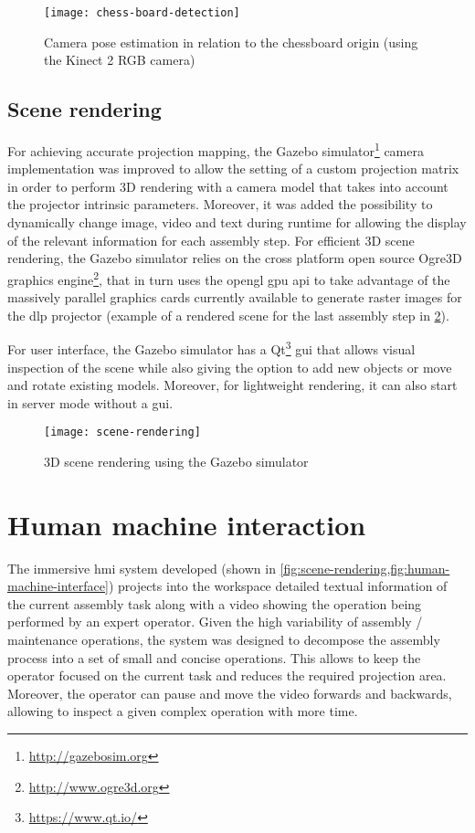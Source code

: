 \begin{figure}[H]
	\centering
	\texttt{[image: chess-board-detection]}
	\caption{Camera pose estimation in relation to the chessboard origin (using the Kinect 2 RGB camera)}
	\label{fig:chess-board-detection}
\end{figure}


\subsection{Scene rendering}

For achieving accurate projection mapping, the Gazebo simulator\footnote{\url{http://gazebosim.org}} camera implementation was improved to allow the setting of a custom projection matrix in order to perform 3D rendering with a camera model that takes into account the projector intrinsic parameters. Moreover, it was added the possibility to dynamically change image, video and text during runtime for allowing the display of the relevant information for each assembly step.
For efficient 3D scene rendering, the Gazebo simulator relies on the cross platform open source Ogre3D graphics engine\footnote{\url{http://www.ogre3d.org}}, that in turn uses the \gls{opengl} \gls{gpu} \gls{api} to take advantage of the massively parallel graphics cards currently available to generate raster images for the \gls{dlp} projector (example of a rendered scene for the last assembly step in \cref{fig:scene-rendering}).

For user interface, the Gazebo simulator has a Qt\footnote{\url{https://www.qt.io/}} \gls{gui} that allows visual inspection of the scene while also giving the option to add new objects or move and rotate existing models. Moreover, for lightweight rendering, it can also start in server mode without a \gls{gui}.

\begin{figure}
	\centering
	\texttt{[image: scene-rendering]}
	\caption{3D scene rendering using the Gazebo simulator}
	\label{fig:scene-rendering}
\end{figure}



\section{Human machine interaction}\label{sec:human-machine-interaction}

The immersive \gls{hmi} system developed (shown in \cref{fig:scene-rendering,fig:human-machine-interface}) projects into the workspace detailed textual information of the current assembly task along with a video showing the operation being performed by an expert operator. Given the high variability of assembly / maintenance operations, the system was designed to decompose the assembly process into a set of small and concise operations. This allows to keep the operator focused on the current task and reduces the required projection area. Moreover, the operator can pause and move the video forwards and backwards, allowing to inspect a given complex operation with more time.

